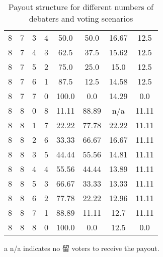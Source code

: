 \begin{enumerate}
\begin{table}[h]
\begin{threeparttable}
\begin{tabular}{cccccccc}
8 & 7 & 3 & 4 & 50.0 & 50.0 & 16.67 & 12.5 \\
8 & 7 & 4 & 3 & 62.5 & 37.5 & 15.62 & 12.5 \\
8 & 7 & 5 & 2 & 75.0 & 25.0 & 15.0 & 12.5 \\
8 & 7 & 6 & 1 & 87.5 & 12.5 & 14.58 & 12.5 \\
8 & 7 & 7 & 0 & 100.0 & 0.0 & 14.29 & 0.0 \\
8 & 8 & 0 & 8 & 11.11 & 88.89 & n/a\tnote{a} & 11.11 \\
8 & 8 & 1 & 7 & 22.22 & 77.78 & 22.22 & 11.11 \\
8 & 8 & 2 & 6 & 33.33 & 66.67 & 16.67 & 11.11 \\
8 & 8 & 3 & 5 & 44.44 & 55.56 & 14.81 & 11.11 \\
8 & 8 & 4 & 4 & 55.56 & 44.44 & 13.89 & 11.11 \\
8 & 8 & 5 & 3 & 66.67 & 33.33 & 13.33 & 11.11 \\
8 & 8 & 6 & 2 & 77.78 & 22.22 & 12.96 & 11.11 \\
8 & 8 & 7 & 1 & 88.89 & 11.11 & 12.7 & 11.11 \\
8 & 8 & 8 & 0 & 100.0 & 0.0 & 12.5 & 0.0 \\
\bottomrule
\end{tabular}
\begin{tablenotes}
    \item[a] n/a indicates no 留 voters to receive the payout.
\end{tablenotes}
\caption{Payout structure for different numbers of debaters and voting scenarios}
\end{threeparttable}
\end{table}


\end{enumerate}
